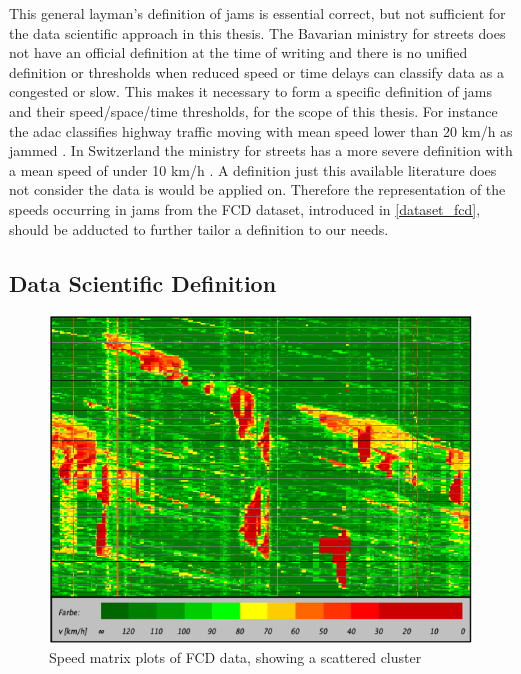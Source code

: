 This general layman's definition of jams is essential correct, but not sufficient for the data scientific approach in this thesis. The Bavarian ministry for streets does not have an official definition at the time of writing and there is no unified definition or thresholds when reduced speed or time delays can classify data as a congested or slow. This makes it necessary to form a specific definition of \glspl{jam} and their speed/space/time thresholds, for the scope of this thesis. For instance the \acrshort{adac} classifies highway traffic moving with mean speed lower than 20 km/h as jammed \parencite{ADAC2019}. In Switzerland the ministry for streets has a more severe definition with a mean speed of under 10 km/h \parencite{ASTRA2020}. A definition just this available literature does not consider the data is would be applied on. Therefore the representation of the speeds occurring in jams from the FCD dataset, introduced in \cref{dataset_fcd}, should be adducted to further tailor a definition to our needs. 

\subsection{Data Scientific Definition}

\begin{figure}[ht]
	\centering
	\includegraphics[scale=0.8]{images/SpeedMatrixPlot_single}
	\caption{Speed matrix plots of FCD data, showing a scattered cluster}
	\label{img:speedMatrixPlot_singleCluster}
\end{figure}

